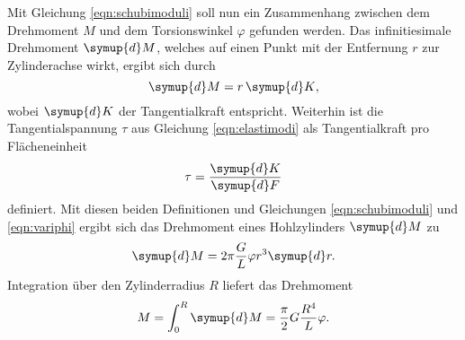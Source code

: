 Mit Gleichung \eqref{eqn:schubimoduli} soll nun ein Zusammenhang zwischen dem Drehmoment $M$ 
und dem Torsionswinkel $\varphi$ gefunden werden. 
Das infinitiesimale Drehmoment $\symup{d} M$, welches auf einen Punkt mit der Entfernung $r$ 
zur Zylinderachse wirkt, ergibt sich durch  
\begin{equation*}
	\symup{d} M = r \, \symup{d}K \mathrm{,}
\end{equation*}
wobei $\symup{d} K$ der Tangentialkraft entspricht.
Weiterhin ist die Tangentialspannung $\tau$ aus Gleichung \eqref{eqn:elastimodi} als 
Tangentialkraft pro Flächeneinheit 
\begin{equation*}
	\tau = \frac{\symup{d} K}{\symup{d} F}
\end{equation*}
definiert.
Mit diesen beiden Definitionen und Gleichungen \eqref{eqn:schubimoduli} und \eqref{eqn:variphi}
ergibt sich das Drehmoment eines Hohlzylinders $\symup{d} M$ zu 
\begin{equation}
	\symup{d} M = 2\pi \frac{G}{L} \varphi r^3 \symup{d}r \mathrm{.}
\end{equation}
Integration über den Zylinderradius $R$ liefert das Drehmoment
\begin{equation}
	\label{eqn:drehmoment}
	M = \int_0^R \symup{d} M = \frac{\pi}{2} G \frac{R^4}{L} \varphi \mathrm{.}
\end{equation}






\cite{Anleitung}
